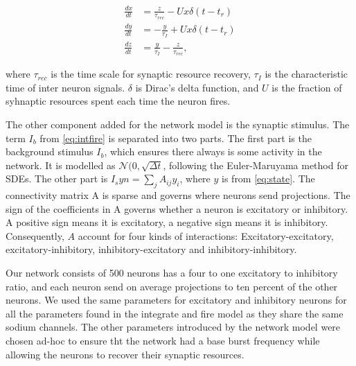 \begin{align} \label{eq:state}
    \frac{dx}{dt} &= \frac{z}{\tau_{rec}} - Ux\delta(t - t_r) \\      %
    \frac{dy}{dt} &= -\frac{y}{\tau_I} + Ux\delta(t - t_r) \\
    \frac{dz}{dt} &= \frac{y}{\tau_I} - \frac{z}{\tau_{rec}},
\end{align}

where \(\tau_{rec}\) is the time scale for synaptic resource recovery, \(\tau_I\) is the
characteristic time of inter neuron signals. \(\delta\) is Dirac's delta function, and \(U\) is the
fraction of syhnaptic resources spent each time the neuron fires.

The other component added for the network model is the synaptic stimulus. The term \(I_b\) from
\ref{eq:intfire} is separated into two parts. The first part is the background stimulus \(I_b\),
which ensures there always is some activity in the network. It is modelled as
\(\mathcal{N}(0, \sqrt{\Delta t}\), following the Euler-Maruyama method for SDEs. The other part is
\(I_syn = \sum_{j}A_{ij}y_i\), where \(y\) is from \cref{eq:state}. The connectivity matrix A is
sparse and governs where neurons send projections. The sign of the coefficients in A governs whether
a neuron is excitatory or inhibitory. A positive sign means it is excitatory, a negative sign means
it is inhibitory. Consequently, \(A\) account for four kinds of interactions: Excitatory-excitatory,
excitatory-inhibitory, inhibitory-excitatory and inhibitory-inhibitory.

Our network consists of 500 neurons has a four to one excitatory to inhibitory ratio, and each
neuron send on average projections to ten percent of the other neurons. We used the same parameters
for excitatory and inhibitory neurons for all the parameters found in the integrate and fire model
as they share the same sodium channels. The other parameters introduced by the network model were
chosen ad-hoc to ensure tht the network had a base burst frequency while allowing the neurons to
recover their synaptic resources.


